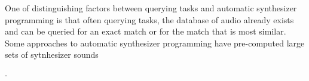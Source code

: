 One of distinguishing factors between querying tasks and automatic synthesizer programming is that often querying tasks, the database of audio already exists and can be queried for an exact match or for the match that is most similar. Some approaches to automatic synthesizer programming have pre-computed large sets of sytnhesizer sounds 

- 